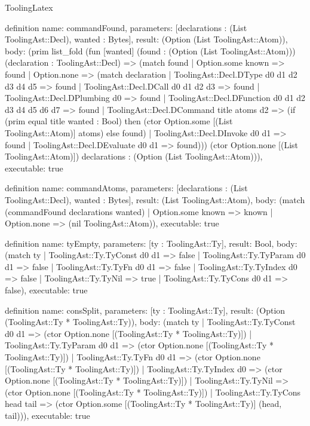 \begin{lexlean}{ToolingLatex}
\begin{semanticmodule}
definition{
  name: commandFound,
  parameters: [declarations : (List ToolingAst::Decl), wanted : Bytes],
  result: (Option (List ToolingAst::Atom)),
  body: (prim list_fold (fun [wanted] (found : (Option (List ToolingAst::Atom))) (declaration : ToolingAst::Decl) => (match found
    | Option.some known => found
    | Option.none => (match declaration
      | ToolingAst::Decl.DType d0 d1 d2 d3 d4 d5 => found
      | ToolingAst::Decl.DCall d0 d1 d2 d3 => found
      | ToolingAst::Decl.DPlumbing d0 => found
      | ToolingAst::Decl.DFunction d0 d1 d2 d3 d4 d5 d6 d7 => found
      | ToolingAst::Decl.DCommand title atoms d2 => (if (prim equal title wanted : Bool) then (ctor Option.some [(List ToolingAst::Atom)] atoms) else found)
      | ToolingAst::Decl.DInvoke d0 d1 => found
      | ToolingAst::Decl.DEvaluate d0 d1 => found))) (ctor Option.none [(List ToolingAst::Atom)]) declarations : (Option (List ToolingAst::Atom))),
  executable: true
}

definition{
  name: commandAtoms,
  parameters: [declarations : (List ToolingAst::Decl), wanted : Bytes],
  result: (List ToolingAst::Atom),
  body: (match (commandFound declarations wanted)
    | Option.some known => known
    | Option.none => (nil ToolingAst::Atom)),
  executable: true
}

definition{
  name: tyEmpty,
  parameters: [ty : ToolingAst::Ty],
  result: Bool,
  body: (match ty
    | ToolingAst::Ty.TyConst d0 d1 => false
    | ToolingAst::Ty.TyParam d0 d1 => false
    | ToolingAst::Ty.TyFn d0 d1 => false
    | ToolingAst::Ty.TyIndex d0 => false
    | ToolingAst::Ty.TyNil => true
    | ToolingAst::Ty.TyCons d0 d1 => false),
  executable: true
}

definition{
  name: consSplit,
  parameters: [ty : ToolingAst::Ty],
  result: (Option (ToolingAst::Ty * ToolingAst::Ty)),
  body: (match ty
    | ToolingAst::Ty.TyConst d0 d1 => (ctor Option.none [(ToolingAst::Ty * ToolingAst::Ty)])
    | ToolingAst::Ty.TyParam d0 d1 => (ctor Option.none [(ToolingAst::Ty * ToolingAst::Ty)])
    | ToolingAst::Ty.TyFn d0 d1 => (ctor Option.none [(ToolingAst::Ty * ToolingAst::Ty)])
    | ToolingAst::Ty.TyIndex d0 => (ctor Option.none [(ToolingAst::Ty * ToolingAst::Ty)])
    | ToolingAst::Ty.TyNil => (ctor Option.none [(ToolingAst::Ty * ToolingAst::Ty)])
    | ToolingAst::Ty.TyCons head tail => (ctor Option.some [(ToolingAst::Ty * ToolingAst::Ty)] (head, tail))),
  executable: true
}


\end{semanticmodule}
\end{lexlean}
